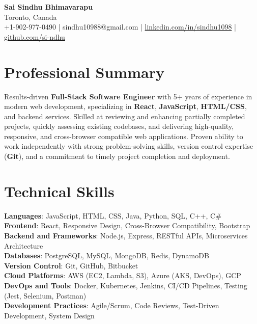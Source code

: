\documentclass[letterpaper,11pt]{article}
\begin{document}
\begin{center}
  {\Large \textbf{Sai Sindhu Bhimavarapu}} \\
  Toronto, Canada \\
  +1-902-977-0490 \enspace | \enspace sindhu10988@gmail.com \enspace | \enspace \href{https://www.linkedin.com/in/sindhu1098/}{linkedin.com/in/sindhu1098} \enspace | \enspace \href{https://github.com/si-ndhu}{github.com/si-ndhu}
\end{center}

\section{Professional Summary}
  \begin{itemize}[leftmargin=0.15in, label={}]
    \small{\item{
     Results-driven \textbf{Full-Stack Software Engineer} with 5+ years of experience in modern web development, specializing in \textbf{React}, \textbf{JavaScript}, \textbf{HTML/CSS}, and backend services. Skilled at reviewing and enhancing partially completed projects, quickly assessing existing codebases, and delivering high-quality, responsive, and cross-browser compatible web applications. Proven ability to work independently with strong problem-solving skills, version control expertise (\textbf{Git}), and a commitment to timely project completion and deployment.
    }}
  \end{itemize}
\vspace{-16pt}

\section{Technical Skills}
 \begin{itemize}[leftmargin=0.15in, label={}]
    \small{\item{
     \textbf{Languages}: JavaScript, HTML, CSS, Java, Python, SQL, C++, C\# \\
     \textbf{Frontend}: React, Responsive Design, Cross-Browser Compatibility, Bootstrap \\
     \textbf{Backend and Frameworks}: Node.js, Express, RESTful APIs, Microservices Architecture \\
     \textbf{Databases}: PostgreSQL, MySQL, MongoDB, Redis, DynamoDB \\
     \textbf{Version Control}: Git, GitHub, Bitbucket \\
     \textbf{Cloud Platforms}: AWS (EC2, Lambda, S3), Azure (AKS, DevOps), GCP \\
     \textbf{DevOps and Tools}: Docker, Kubernetes, Jenkins, CI/CD Pipelines, Testing (Jest, Selenium, Postman) \\
     \textbf{Development Practices}: Agile/Scrum, Code Reviews, Test-Driven Development, System Design
    }}
 \end{itemize}
\vspace{-16pt}
\end{document}
